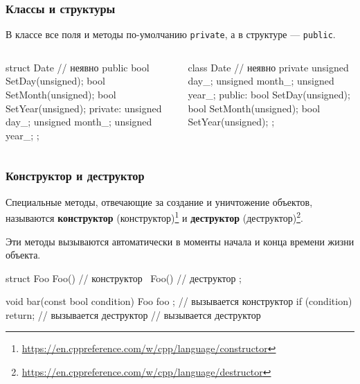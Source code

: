 \documentclass[compress, 8pt]{beamer}
\begin{document}
\begin{frame}[fragile]

    \frametitle{Классы и структуры}

    В классе все поля и методы по-умолчанию \verb|private|, а в структуре
    --- \verb|public|.

    \begin{columns}[T]

        \begin{column}{0.5\textwidth}

            \begin{myinplacelisting}[minted language=cpp]
struct Date {
    // неявно public
    bool SetDay(unsigned);
    bool SetMonth(unsigned);
    bool SetYear(unsigned);
private:
    unsigned day_;
    unsigned month_;
    unsigned year_;
};
            \end{myinplacelisting}

        \end{column}

        \begin{column}{0.5\textwidth}

            \begin{myinplacelisting}[minted language=cpp]
class Date {
    // неявно private
    unsigned day_;
    unsigned month_;
    unsigned year_;
public:
    bool SetDay(unsigned);
    bool SetMonth(unsigned);
    bool SetYear(unsigned);
};
            \end{myinplacelisting}

        \end{column}

    \end{columns}

\end{frame}

\begin{frame}[fragile]

    \frametitle{Конструктор и деструктор}

    Специальные методы, отвечающие за создание и уничтожение объектов, называются
    \textbf{конструктор} (конструктор)\footnote{\url{https://en.cppreference.com/w/cpp/language/constructor}}
    и \textbf{деструктор} (деструктор)\footnote{\url{https://en.cppreference.com/w/cpp/language/destructor}}.

    Эти методы вызываются автоматически в моменты начала и конца времени жизни объекта.

    \begin{myinplacelisting}[minted language=cpp]
struct Foo {
    Foo() {} // конструктор
    ~Foo() {} // деструктор
};

void bar(const bool condition) {
    Foo foo {}; // вызывается конструктор
    if (condition) {
        return; // вызывается деструктор
    }
} // вызывается деструктор
    \end{myinplacelisting}

\end{frame}
\end{document}
